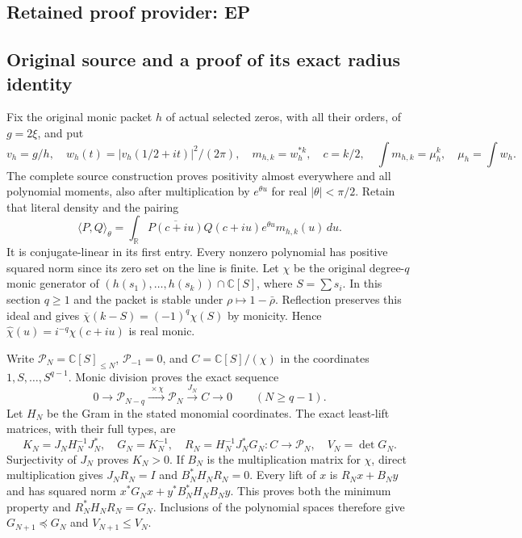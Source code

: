 \documentclass[11pt,a4paper]{article}
\newcommand{\C}{\mathbb C}
\newcommand{\R}{\mathbb R}
\begin{document}

\clearpage
\subsection*{Retained proof provider: EP}

\subsection{Original source and a proof of its exact radius identity}
Fix the original monic packet $h$ of actual selected zeros, with all
their orders, of $g=2\xi$, and put
\[
 v_h=g/h,\quad w_h(t)=|v_h(1/2+it)|^2/(2\pi),\quad
 m_{h,k}=w_h^{*k},\quad c=k/2,
 \quad \int m_{h,k}=\mu_h^k,\quad \mu_h=\int w_h.\tag{EP.1}
\]
The complete source construction proves positivity almost everywhere
and all polynomial moments, also after multiplication by $e^{\theta u}$
for real $|\theta|<\pi/2$. Retain that literal density and the pairing
\[
 \langle P,Q\rangle_\theta=
 \int_\R\overline{P(c+iu)}Q(c+iu)e^{\theta u}m_{h,k}(u)\,du.
 \tag{EP.2}
\]
It is conjugate-linear in its first entry. Every nonzero polynomial has
positive squared norm since its zero set on the line is finite.
Let $\chi$ be the original degree-$q$ monic generator of
$(h(s_1),\ldots,h(s_k))\cap\C[S]$, where $S=\sum s_i$.
In this section $q\ge1$ and the packet is stable under
$\rho\mapsto1-\bar\rho$. Reflection preserves this ideal and gives
$\overline\chi(k-S)=(-1)^q\chi(S)$ by monicity. Hence
$\widehat\chi(u)=i^{-q}\chi(c+iu)$ is real monic.

Write $\mathcal P_N=\C[S]_{\le N}$, $\mathcal P_{-1}=0$, and
$C=\C[S]/(\chi)$ in the coordinates $1,S,\ldots,S^{q-1}$.
Monic division proves the exact sequence
\[
0\longrightarrow\mathcal P_{N-q}\xrightarrow{\,\times\chi\,}
\mathcal P_N\xrightarrow{J_N}C\longrightarrow0\qquad(N\ge q-1).
\tag{EP.3}
\]
Let $H_N$ be the Gram in the stated monomial coordinates. The exact
least-lift matrices, with their full types, are
\[
 K_N=J_NH_N^{-1}J_N^*,\quad G_N=K_N^{-1},\quad
 R_N=H_N^{-1}J_N^*G_N:C\longrightarrow\mathcal P_N,
 \quad V_N=\det G_N.\tag{EP.4}
\]
Surjectivity of $J_N$ proves $K_N>0$. If $B_N$ is the multiplication
matrix for $\chi$, direct multiplication gives $J_NR_N=I$ and
$B_N^*H_NR_N=0$. Every lift of $x$ is $R_Nx+B_Ny$ and has squared
norm $x^*G_Nx+y^*B_N^*H_NB_Ny$. This proves both the minimum
property and $R_N^*H_NR_N=G_N$. Inclusions of the polynomial spaces
therefore give $G_{N+1}\preceq G_N$ and $V_{N+1}\le V_N$.
\end{document}
